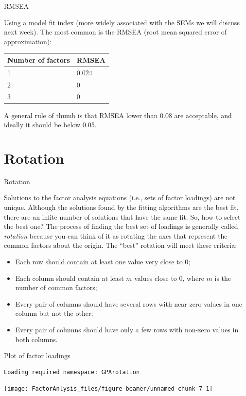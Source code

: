 \documentclass[10pt,ignorenonframetext,]{beamer}
\providecommand{\tightlist}{%
\setlength{\itemsep}{0pt}\setlength{\parskip}{0pt}}
\begin{document}
\begin{frame}{RMSEA}

Using a model fit index (more widely associated with the SEMs we will
discuss next week). The most common is the RMSEA (root mean squared
error of approximation):

\begin{longtable}[]{@{}ll@{}}
\toprule
Number of factors & RMSEA\tabularnewline
\midrule
\endhead
1 & 0.024\tabularnewline
2 & 0\tabularnewline
3 & 0\tabularnewline
\bottomrule
\end{longtable}

A general rule of thumb is that RMSEA lower than 0.08 are acceptable,
and ideally it should be below 0.05.

\end{frame}

\section{Rotation}\label{rotation}

\begin{frame}{Rotation}

Solutions to the factor analysis equations (i.e., sets of factor
loadings) are not unique. Although the solutions found by the fitting
algorithms are the best fit, there are an infite number of solutions
that have the same fit. So, how to select the best one? The process of
finding the best set of loadings is generally called \emph{rotation}
because you can think of it as rotating the axes that represent the
common factors about the origin. The ``best'' rotation will meet these
criteria:

\begin{itemize}
\tightlist
\item
  Each row should contain at least one value very close to 0;
\item
  Each column should contain at least \(m\) values close to 0, where
  \(m\) is the number of common factors;
\item
  Every pair of columns should have several rows with near zero values
  in one column but not the other;
\item
  Every pair of columns should have only a few rows with non-zero values
  in both columns.
\end{itemize}

\end{frame}

\begin{frame}[fragile]{Plot of factor loadings}

\begin{verbatim}
Loading required namespace: GPArotation
\end{verbatim}

\texttt{[image: FactorAnlysis\_files/figure-beamer/unnamed-chunk-7-1]}

\end{frame}
\end{document}
